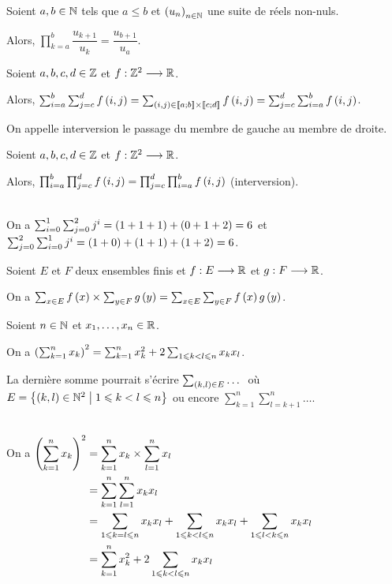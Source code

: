 \begin{prop}
Soient \(a,b\in\mathbb{N}\) tels que \(a\leq b\) et \(\left(u_n\right)_{n\in\mathbb{N}}\) une suite de réels non-nuls.

Alors, \(\prod_{k=a}^b\dfrac{u_{k+1}}{u_k}=\dfrac{u_{b+1}}{u_a}\).
\end{prop}

\begin{prop}
Soient \(a,b,c,d\in\mathbb{Z}\) et \(f:\mathbb{Z}^2\longrightarrow\mathbb{R}\).

Alors, \(\sum_{i=a}^b\sum_{j=c}^d f\left(i,j\right)=\sum_{\left(i,j\right)\in\left\llbracket a;b\right\rrbracket\times\left\llbracket c;d\right\rrbracket}f\left(i,j\right)=\sum_{j=c}^d\sum_{i=a}^b f\left(i,j\right)\).

On appelle interversion le passage du membre de gauche au membre de droite.
\end{prop}

\begin{prop}
Soient \(a,b,c,d\in\mathbb{Z}\) et \(f:\mathbb{Z}^2\longrightarrow\mathbb{R}\).

Alors, \(\prod_{i=a}^b\prod_{j=c}^d f\left(i,j\right)=\prod_{j=c}^d\prod_{i=a}^b f\left(i,j\right)\) (interversion).
\end{prop}

\begin{ex}~\\
On a \(\sum_{i=0}^1\sum_{j=0}^2 j^i=\left(1+1+1\right)+\left(0+1+2\right)=6\) et \(\sum_{j=0}^2\sum_{i=0}^1 j^i=\left(1+0\right)+\left(1+1\right)+\left(1+2\right)=6\).
\end{ex}

\begin{prop}
Soient \(E\) et \(F\) deux ensembles finis et \(f:E\longrightarrow\mathbb{R}\) et \(g:F\longrightarrow\mathbb{R}\).

On a \(\sum_{x\in E}f\left(x\right)\times\sum_{y\in F}g\left(y\right)=\sum_{x\in E}\sum_{y\in F}f\left(x\right)g\left(y\right)\).
\end{prop}

\begin{ex}
Soient \(n\in\mathbb{N}\) et \(x_1,\dots,x_n\in\mathbb{R}\).

On a \(\left(\sum_{k=1}^n x_k\right)^2=\sum_{k=1}^n x_k^2+2\sum_{1\leqslant k<l\leqslant n}x_kx_l\).
\end{ex}

\begin{rem}
La dernière somme pourrait s'écrire \(\sum_{\left(k,l\right)\in E}\dots\ \) où \(E=\left\lbrace\left(k,l\right)\in\mathbb{N}^2\;\middle|\;1\leqslant k<l\leqslant n\right\rbrace\) ou encore \(\sum_{k=1}^n\sum_{l=k+1}^n\dots\).
\end{rem}

\begin{dem}~\\
On a \(\begin{aligned}[t]
\left(\sum_{k=1}^n x_k\right)^2&=\sum_{k=1}^n x_k\times\sum_{l=1}^n x_l \\
&=\sum_{k=1}^n\sum_{l=1}^n x_kx_l \\
&=\sum_{1\leqslant k=l\leqslant n}x_kx_l+\sum_{1\leqslant k<l\leqslant n}x_kx_l+\sum_{1\leqslant l<k\leqslant n}x_kx_l \\
&=\sum_{k=1}^n x_k^2+2\sum_{1\leqslant k<l\leqslant n}x_kx_l
\end{aligned}\)

~
\end{dem}

